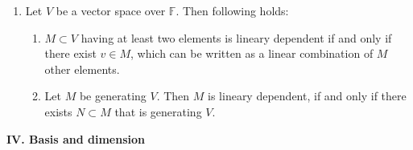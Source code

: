 \documentclass{article}
\newcommand{\<}{\left<}
\renewcommand{\>}{\right>}
\newcommand{\F}{\mathbb{F}}
\begin{document}
\begin{multicols}{3}
\begin{enumerate}[itemsep=2pt, topsep=2pt, partopsep=2pt, parsep=2pt]
        \item Let $V$ be a vector space over $\F$. Then following holds:
            \begin{enumerate}[itemsep=0pt, topsep=0pt, partopsep=0pt, parsep=0pt]
                \item $M\subset V$ having at least two elements is lineary dependent if and only if there exist $v\in M$, which can be written as a linear combination of $M$ other elements.
                \item Let $M$ be generating $V$. Then $M$ is lineary dependent, if and only if there exists $N\subset M$ that is generating $V$.
            \end{enumerate}


    \end{enumerate}

    \textbf{IV. Basis and dimension}

    \begin{enumerate}[itemsep=2pt, topsep=2pt, partopsep=2pt, parsep=2pt]


\end{enumerate}
\end{multicols}
\end{document}
